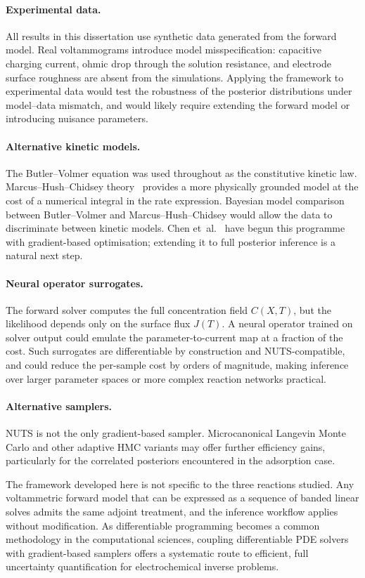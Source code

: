 \paragraph{Experimental data.}
All results in this dissertation use synthetic data generated from the
forward model. Real voltammograms introduce model misspecification:
capacitive charging current, ohmic drop through the solution resistance,
and electrode surface roughness are absent from the simulations. Applying
the framework to experimental data would test the robustness of the
posterior distributions under model--data mismatch, and would likely
require extending the forward model or introducing nuisance parameters.

\paragraph{Alternative kinetic models.}
The Butler--Volmer equation was used throughout as the constitutive
kinetic law. Marcus--Hush--Chidsey
theory~\cite{compton2014understanding} provides a more
physically grounded model at the cost of a numerical integral in the
rate expression. Bayesian model comparison between Butler--Volmer and
Marcus--Hush--Chidsey would allow the data to discriminate between kinetic
models. Chen et~al.~\cite{chen2026differentiable} have begun this
programme with gradient-based optimisation; extending it to full
posterior inference is a natural next step.

\paragraph{Neural operator surrogates.}
The forward solver computes the full concentration field $C(X,T)$, but
the likelihood depends only on the surface flux $J(T)$. A neural
operator trained on solver output could emulate the
parameter-to-current map at a fraction of the cost. Such surrogates
are differentiable by construction and NUTS-compatible, and could
reduce the per-sample cost by orders of magnitude, making inference
over larger parameter spaces or more complex reaction networks practical.

\paragraph{Alternative samplers.}
NUTS is not the only gradient-based sampler. Microcanonical Langevin
Monte Carlo and other adaptive HMC variants may offer further
efficiency gains, particularly for the correlated posteriors
encountered in the adsorption case.

\medskip

The framework developed here is not specific to the three reactions
studied. Any voltammetric forward model that can be expressed as a
sequence of banded linear solves admits the same adjoint treatment, and
the inference workflow applies without modification. As differentiable
programming becomes a common methodology in the computational
sciences, coupling differentiable PDE solvers
with gradient-based samplers offers a systematic route to efficient, full
uncertainty quantification for electrochemical inverse problems.
